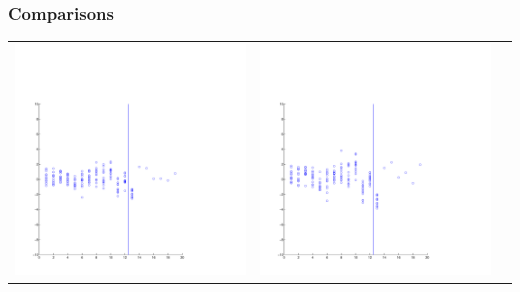 \documentclass{beamer}
\begin{document}
\begin{frame}
\frametitle{Comparisons}
\begin{tabular}{ccc}
\includegraphics[scale=0.15]{ex2_data1c_spm.pdf} & 
\includegraphics[scale=0.15]{ex2_data1c.pdf} & 

\end{tabular}
\end{frame}
\end{document}

